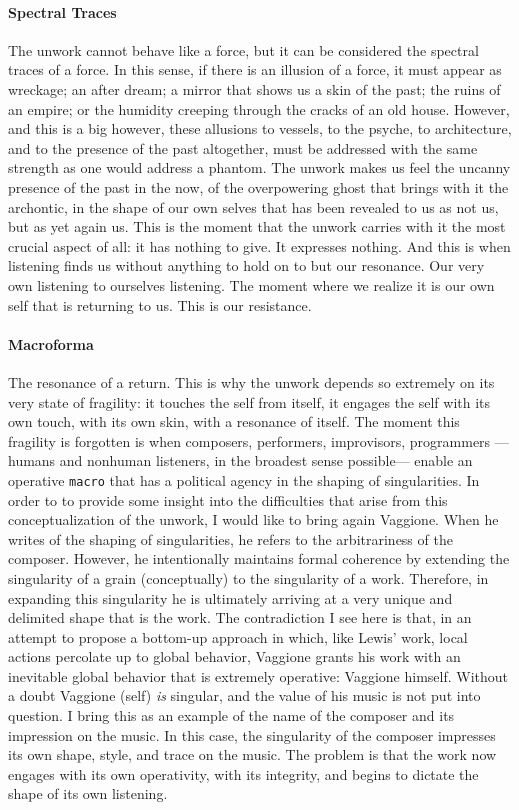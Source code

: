 \paragraph{Spectral Traces}
The unwork cannot behave like a force, but it can be considered the spectral traces of a force. In this sense, if there is an illusion of a force, it must appear as wreckage; an after dream; a mirror that shows us a skin of the past; the ruins of an empire; or the humidity creeping through the cracks of an old house. However, and this is a big however, these allusions to vessels, to the psyche, to architecture, and to the presence of the past altogether, must be addressed with the same strength as one would address a phantom. The unwork makes us feel the uncanny presence of the past in the now, of the overpowering ghost that brings with it the archontic, in the shape of our own selves that has been revealed to us as not us, but as yet again us. This is the moment that the unwork carries with it the most crucial aspect of all: it has nothing to give. It expresses nothing. And this is when listening finds us without anything to hold on to but our resonance. Our very own listening to ourselves listening. The moment where we realize it is our own self that is returning to us. This is our resistance.

\paragraph{Macroforma}
The resonance of a return. This is why the unwork depends so extremely on its very state of fragility: it touches the self from itself, it engages the self with its own touch, with its own skin, with a resonance of itself. The moment this fragility is forgotten is when composers, performers, improvisors, programmers ---humans and nonhuman listeners, in the broadest sense possible--- enable an operative \texttt{macro} that has a political agency in the shaping of singularities. In order to to provide some insight into the difficulties that arise from this conceptualization of the unwork, I would like to bring again Vaggione. When he writes of the shaping of singularities, he refers to the arbitrariness of the composer. However, he intentionally maintains formal coherence by extending the singularity of a grain (conceptually) to the singularity of a work. Therefore, in expanding this singularity he is ultimately arriving at a very unique and delimited shape that is the work. The contradiction I see here is that, in an attempt to propose a bottom-up approach in which, like Lewis' work, local actions percolate up to global behavior, Vaggione grants his work with an inevitable global behavior that is extremely operative: Vaggione himself. Without a doubt Vaggione (self) \textit{is} singular, and the value of his music is not put into question. I bring this as an example of the name of the composer and its impression on the music. In this case, the singularity of the composer impresses its own shape, style, and trace on the music. The problem is that the work now engages with its own operativity, with its integrity, and begins to dictate the shape of its own listening.

